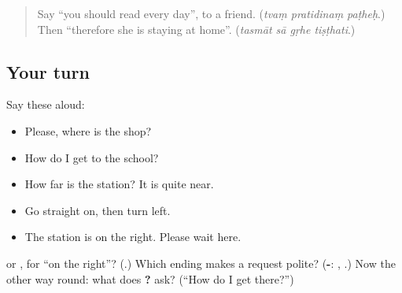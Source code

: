 \label{lesson:SA-R280-asking-the-way}



\begin{quote}
Say \textquotedblleft{}you should read every day\textquotedblright{}, to a friend. (\emph{tvaṃ pratidinaṃ paṭheḥ}.) Then \textquotedblleft{}therefore she is staying at home\textquotedblright{}. (\emph{tasmāt sā gṛhe tiṣṭhati}.)
\end{quote}

\subsection*{Your turn}
Say these aloud:

\begin{itemize}
\raggedright
  \item Please, where is the shop?
  \item How do I get to the school?
  \item How far is the station? It is quite near.
  \item Go straight on, then turn left.
  \item The station is on the right. Please wait here.
\end{itemize}

\begin{tcolorbox}[breakable,colback=teal!4,colframe=teal!35!black,title={Before you move on}]
\textbf{} or \textbf{}, for \textquotedblleft{}on the right\textquotedblright{}? (\textbf{}.) Which ending makes a request polite? (\textbf{-}: \textbf{}, \textbf{}.) Now the other way round: what does \textbf{ ?} ask? (\textquotedblleft{}How do I get there?\textquotedblright{})
\end{tcolorbox}
